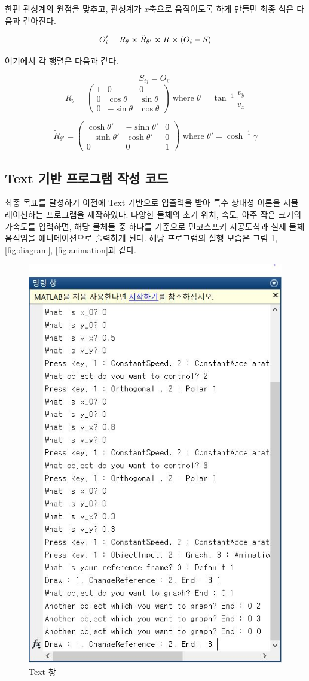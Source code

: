 \documentclass{thesis-SJ}
\begin{document}
한편 관성계의 원점을 맞추고, 관성계가 $x$축으로 움직이도록 하게 만들면 최종 식은 다음과 같아진다.

\begin{equation}
	O'_i = R_{\theta}\cross \tilde{R}_{\theta'}\cross R \cross (O_i - S)
\end{equation}

여기에서 각 행렬은 다음과 같다.

\[ S_{ij} = O_{i1} \]
\[ R_{\theta} = \begin{pmatrix}
1 & 0 & 0 \\
0 & \cos \theta & \sin \theta \\
0 & -\sin \theta & \cos \theta 
\end{pmatrix}\text{ where }\theta=\tan^{-1}\frac{v_y}{v_x} \] 

\[ \tilde{R}_{\theta'} = \begin{pmatrix}
\cosh \theta' & -\sinh \theta' & 0\\
-\sinh \theta' & \cosh \theta' & 0\\
0 & 0 & 1
\end{pmatrix} \text{ where } \theta' = \cosh^{-1} \gamma \]


\subsection{Text 기반 프로그램 작성 코드}
최종 목표를 달성하기 이전에 Text 기반으로 입출력을 받아 특수 상대성 이론을 시뮬레이션하는 프로그램을 제작하였다. 다양한 물체의 초기 위치, 속도, 아주 작은 크기의 가속도를 입력하면, 해당 물체들 중 하나를 기준으로 민코스프키 시공도식과 실제 물체 움직임을 애니메이션으로 출력하게 된다. 해당 프로그램의 실행 모습은 그림 \ref{fig:simulation}, \ref{fig:diagram}, \ref{fig:animation}과 같다.
\begin{figure}[h]
	\centering
	\includegraphics[width=0.6\linewidth]{images/simulation}
	\caption{Text 창}
	\label{fig:simulation}
\end{figure}
\end{document}
